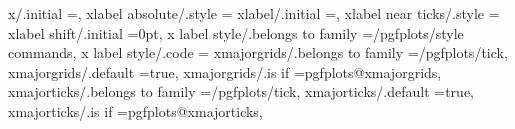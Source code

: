 {{{{{{{{x/.initial                                                         =,%
xlabel absolute/.style                                             ={%
xlabel/.initial                                                    =,                                                                                                                                  
xlabel near ticks/.style                                           ={%
xlabel shift/.initial                                              =0pt,                                                                                                                               
x label style/.belongs to family                                   =/pgfplots/style commands,                                                                                                          
x label style/.code                                                ={%
xmajorgrids/.belongs to family                                     =/pgfplots/tick,                                                                                                                    
xmajorgrids/.default                                               =true,                                                                                                                              
xmajorgrids/.is if                                                 =pgfplots@xmajorgrids,                                                                                                              
xmajorticks/.belongs to family                                     =/pgfplots/tick,                                                                                                                    
xmajorticks/.default                                               =true,                                                                                                                              
xmajorticks/.is if                                                 =pgfplots@xmajorticks,                                                                                                              
}}}}}}}}}}}
